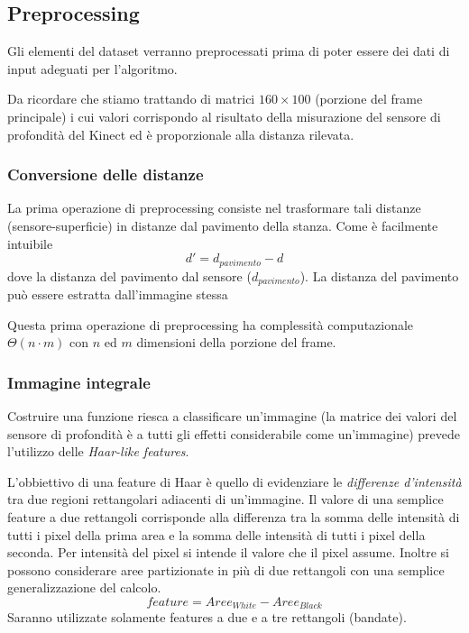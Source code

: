 \documentclass[a4paper,11pt,oneside]{article}
\begin{document}

		\subsection{Preprocessing} %
		\label{sub:preprocessing}
			Gli elementi del dataset verranno preprocessati prima di poter essere dei dati di input adeguati per l'algoritmo.

			Da ricordare che stiamo trattando di matrici $160 \times 100$ (porzione del frame principale) i cui valori corrispondo al risultato della misurazione del sensore di profondità del Kinect ed è proporzionale alla distanza rilevata.

			\subsubsection{Conversione delle distanze} %
			\label{ssub:conversione_delle_distanze}
				La prima operazione di preprocessing consiste nel trasformare tali distanze (sensore-superficie) in distanze dal pavimento della stanza. Come è facilmente intuibile
				$$ d' = d_{pavimento} - d $$
				dove la distanza del pavimento dal sensore ($d_{pavimento}$). La distanza del pavimento può essere estratta dall'immagine stessa 

				Questa prima operazione di preprocessing ha complessità computazionale $\Theta(n \cdot m)$ con $n$ ed $m$ dimensioni della porzione del frame.

			\subsubsection{Immagine integrale} %
			\label{ssub:immagine_integrale}
				Costruire una funzione riesca a classificare un'immagine (la matrice dei valori del sensore di profondità è a tutti gli effetti considerabile come un'immagine) prevede l'utilizzo delle \emph{Haar-like features}.

				L'obbiettivo di una feature di Haar è quello di evidenziare le \emph{differenze d'intensità} tra due regioni rettangolari adiacenti di un'immagine. Il valore di una semplice feature a due rettangoli corrisponde alla differenza tra la somma delle intensità di tutti i pixel della prima area e la somma delle intensità di tutti i pixel della seconda. Per intensità del pixel si intende il valore che il pixel assume. Inoltre si possono considerare aree partizionate in più di due rettangoli con una semplice generalizzazione del calcolo.
				$$feature = Aree_{White} - Aree_{Black}$$
				Saranno utilizzate solamente features a due e a tre rettangoli (bandate).
\end{document}
